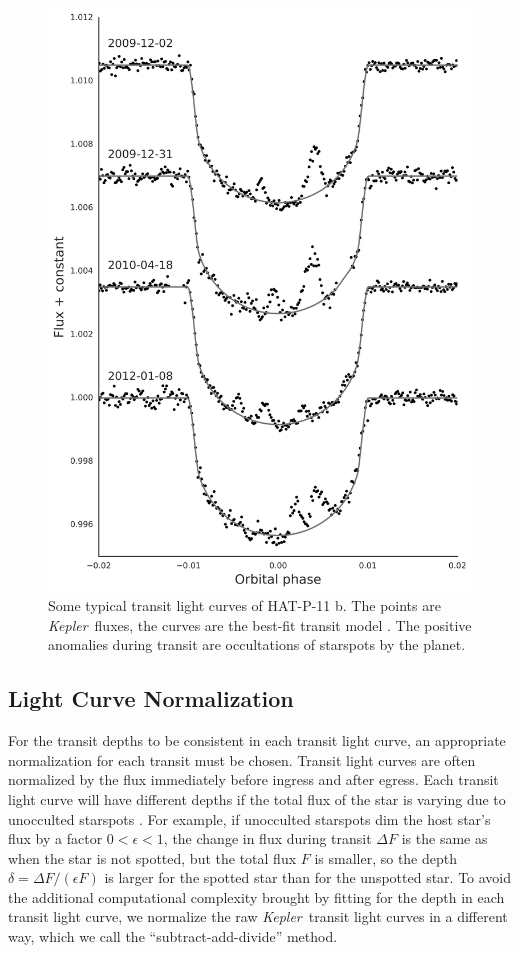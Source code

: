 \documentclass[iop]{emulateapj}
\newcommand{\kepler}{\textit{Kepler}}
\begin{document}
\begin{figure}
\centering
\includegraphics[scale=0.4]{figures/transit_gallery.png}
\caption{Some typical transit light curves of HAT-P-11 b. The points are \kepler\ fluxes, the curves are the best-fit transit model \citep{Mandel2002}. The positive anomalies during transit are occultations of starspots by the planet. }
\label{fig:transit_gallery}
\end{figure}

\subsection{Light Curve Normalization}
For the transit depths to be consistent in each transit light curve, an appropriate normalization for each transit must be chosen. Transit light curves are often normalized by the flux immediately before ingress and after egress. Each transit light curve will have different depths if the total flux of the star is varying due to unocculted starspots \citep{Czesla2009, Carter2011, Csizmadia2013}. For example, if unocculted starspots dim the host star's flux by a factor $0 < \epsilon < 1$, the change in flux during transit $\Delta F$ is the same as when the star is not spotted, but the total flux $F$ is smaller, so the depth $\delta = \Delta F / (\epsilon F)$ is larger for the spotted star than for the unspotted star. To avoid the additional computational complexity brought by fitting for the depth in each transit light curve, we normalize the raw \kepler\ transit light curves in a different way, which we call the ``subtract-add-divide'' method. 
\end{document}
